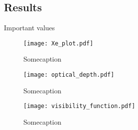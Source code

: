 \subsection{Results}\label{sec:m2:results} 

    \begin{table}
        
        \caption{Important values}
        \label{tab:m2:recomb_analysis}
    \end{table}

    \begin{figure}
        \texttt{[image: Xe\_plot.pdf]}
        \caption{Somecaption}
        \label{fig:m2:electron_fraction}
    \end{figure}

    \begin{figure}
        \texttt{[image: optical\_depth.pdf]}
        \caption{Somecaption}
        \label{fig:m2:optical_depth}
    \end{figure}

    \begin{figure}
        \texttt{[image: visibility\_function.pdf]}
        \caption{Somecaption}
        \label{fig:m2:visibility_function}
    \end{figure}








